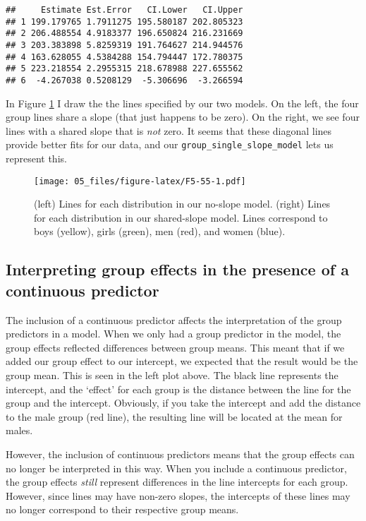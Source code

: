 \documentclass[
]{book}
\begin{document}
\begin{verbatim}
##     Estimate Est.Error   CI.Lower   CI.Upper
## 1 199.179765 1.7911275 195.580187 202.805323
## 2 206.488554 4.9183377 196.650824 216.231669
## 3 203.383898 5.8259319 191.764627 214.944576
## 4 163.628055 4.5384288 154.794447 172.780375
## 5 223.218554 2.2955315 218.678988 227.655562
## 6  -4.267038 0.5208129  -5.306696  -3.266594
\end{verbatim}

In Figure \ref{fig:F5-55} I draw the the lines specified by our two models. On the left, the four group lines share a slope (that just happens to be zero). On the right, we see four lines with a shared slope that is \emph{not} zero. It seems that these diagonal lines provide better fits for our data, and our \texttt{group\_single\_slope\_model} lets us represent this.

\begin{figure}
\centering
\texttt{[image: 05\_files/figure-latex/F5-55-1.pdf]}
\caption{\label{fig:F5-55}(left) Lines for each distribution in our no-slope model. (right) Lines for each distribution in our shared-slope model. Lines correspond to boys (yellow), girls (green), men (red), and women (blue).}
\end{figure}

\hypertarget{interpreting-group-effects-in-the-presence-of-a-continuous-predictor}{%
\subsection{Interpreting group effects in the presence of a continuous predictor}\label{interpreting-group-effects-in-the-presence-of-a-continuous-predictor}}

The inclusion of a continuous predictor affects the interpretation of the group predictors in a model. When we only had a group predictor in the model, the group effects reflected differences between group means. This meant that if we added our group effect to our intercept, we expected that the result would be the group mean. This is seen in the left plot above. The black line represents the intercept, and the `effect' for each group is the distance between the line for the group and the intercept. Obviously, if you take the intercept and add the distance to the male group (red line), the resulting line will be located at the mean for males.

However, the inclusion of continuous predictors means that the group effects can no longer be interpreted in this way. When you include a continuous predictor, the group effects \emph{still} represent differences in the line intercepts for each group. However, since lines may have non-zero slopes, the intercepts of these lines may no longer correspond to their respective group means.
\end{document}
